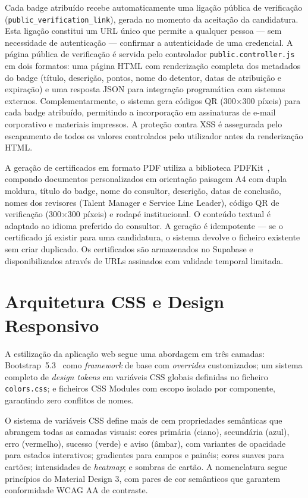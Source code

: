\documentclass[12pt,a4paper]{report}
\begin{document}
Cada badge atribuído recebe automaticamente uma ligação pública de verificação (\texttt{public\_\allowbreak verification\_\allowbreak link}), gerada no momento da aceitação da candidatura. Esta ligação constitui um URL único que permite a qualquer pessoa --- sem necessidade de autenticação --- confirmar a autenticidade de uma credencial. A página pública de verificação é servida pelo controlador \texttt{public.controller.js} em dois formatos: uma página HTML com renderização completa dos metadados do badge (título, descrição, pontos, nome do detentor, datas de atribuição e expiração) e uma resposta JSON para integração programática com sistemas externos. Complementarmente, o sistema gera códigos QR (300$\times$300 píxeis) para cada badge atribuído, permitindo a incorporação em assinaturas de e-mail corporativo e materiais impressos. A proteção contra XSS é assegurada pelo escapamento de todos os valores controlados pelo utilizador antes da renderização HTML.

A geração de certificados em formato PDF utiliza a biblioteca PDFKit~\cite{pdfkit}, compondo documentos personalizados em orientação paisagem A4 com dupla moldura, título do badge, nome do consultor, descrição, datas de conclusão, nomes dos revisores (Talent Manager e Service Line Leader), código QR de verificação (300$\times$300 píxeis) e rodapé institucional. O conteúdo textual é adaptado ao idioma preferido do consultor. A geração é idempotente --- se o certificado já existir para uma candidatura, o sistema devolve o ficheiro existente sem criar duplicado. Os certificados são armazenados no Supabase e disponibilizados através de URLs assinados com validade temporal limitada.

\section{Arquitetura CSS e Design Responsivo}

A estilização da aplicação web segue uma abordagem em três camadas: Bootstrap~5.3\linebreak[0]~\cite{bootstrap} como \textit{framework} de base com \textit{overrides} customizados; um sistema completo de \textit{design tokens} em variáveis CSS globais definidas no ficheiro \texttt{colors.css}; e ficheiros CSS Modules com escopo isolado por componente, garantindo zero conflitos de nomes.

O sistema de variáveis CSS define mais de cem propriedades semânticas que abrangem todas as camadas visuais: cores primária (ciano), secundária (azul), erro (vermelho), sucesso (verde) e aviso (âmbar), com variantes de opacidade para estados interativos; gradientes para campos e painéis; cores suaves para cartões; intensidades de \textit{heatmap}; e sombras de cartão. A nomenclatura segue princípios do Material Design 3, com pares de cor semânticos que garantem conformidade WCAG AA de contraste.
\end{document}
